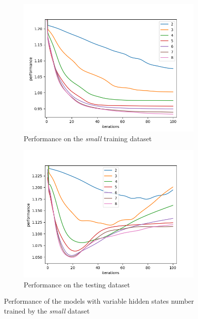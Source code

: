\documentclass[thesis=M,english]{FITthesis}[2012/10/20]
\begin{document}
\begin{figure}
\centering
\begin{subfigure}{.8\textwidth}
  \centering
  \includegraphics[width=1\linewidth]{img/ex5/train_small.png}
  \caption{Performance on the \textit{small} training dataset}
  \label{fig:smtrain}
\end{subfigure}
\begin{subfigure}{.8\textwidth}
  \centering
  \includegraphics[width=1\linewidth]{img/ex5/test_small.png}
  \caption{Performance on the testing dataset}
  \label{fig:smtest}
\end{subfigure}
\caption{Performance of the models with variable hidden states number trained by the \textit{small} dataset}
\label{fig:sm}
\end{figure}
\end{document}
